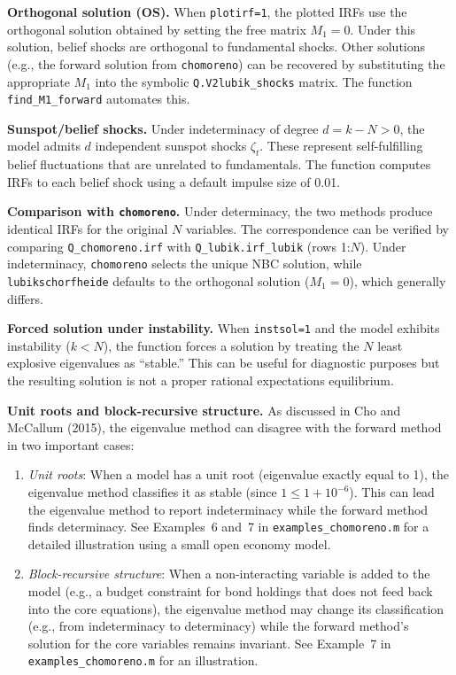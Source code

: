 \documentclass{article}
\begin{document}
\medskip
\noindent\textbf{Orthogonal solution (OS).} When \texttt{plotirf=1}, the plotted IRFs use the orthogonal solution obtained by setting the free matrix $M_1 = 0$. Under this solution, belief shocks are orthogonal to fundamental shocks. Other solutions (e.g., the forward solution from \texttt{chomoreno}) can be recovered by substituting the appropriate $M_1$ into the symbolic \texttt{Q.V2lubik\_shocks} matrix. The function \texttt{find\_M1\_forward} automates this.

\medskip
\noindent\textbf{Sunspot/belief shocks.} Under indeterminacy of degree $d = k - N > 0$, the model admits $d$ independent sunspot shocks $\zeta_t$. These represent self-fulfilling belief fluctuations that are unrelated to fundamentals. The function computes IRFs to each belief shock using a default impulse size of 0.01.

\medskip
\noindent\textbf{Comparison with \texttt{chomoreno}.} Under determinacy, the two methods produce identical IRFs for the original $N$ variables. The correspondence can be verified by comparing \texttt{Q\_chomoreno.irf} with \texttt{Q\_lubik.irf\_lubik} (rows 1:$N$). Under indeterminacy, \texttt{chomoreno} selects the unique NBC solution, while \texttt{lubikschorfheide} defaults to the orthogonal solution ($M_1 = 0$), which generally differs.

\medskip
\noindent\textbf{Forced solution under instability.} When \texttt{instsol=1} and the model exhibits instability ($k < N$), the function forces a solution by treating the $N$ least explosive eigenvalues as ``stable.'' This can be useful for diagnostic purposes but the resulting solution is not a proper rational expectations equilibrium.

\medskip
\noindent\textbf{Unit roots and block-recursive structure.} As discussed in Cho and McCallum (2015), the eigenvalue method can disagree with the forward method in two important cases:
\begin{enumerate}[nosep]
\item \textit{Unit roots}: When a model has a unit root (eigenvalue exactly equal to 1), the eigenvalue method classifies it as stable (since $1 \leq 1 + 10^{-6}$). This can lead the eigenvalue method to report indeterminacy while the forward method finds determinacy. See Examples~6 and~7 in \texttt{examples\_chomoreno.m} for a detailed illustration using a small open economy model.
\item \textit{Block-recursive structure}: When a non-interacting variable is added to the model (e.g., a budget constraint for bond holdings that does not feed back into the core equations), the eigenvalue method may change its classification (e.g., from indeterminacy to determinacy) while the forward method's solution for the core variables remains invariant. See Example~7 in \texttt{examples\_chomoreno.m} for an illustration.
\end{enumerate}
\end{document}
